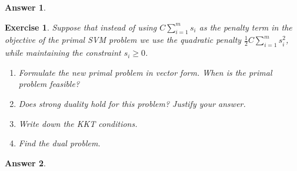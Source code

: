 \documentclass[12pt]{article}
\theoremstyle{colon}
\newtheorem{exercise}{Exercise}
\newtheorem*{answer}{Answer}
\begin{document}
\begin{answer}

\end{answer}

\clearpage

\begin{exercise}
  Suppose that instead of using $C \sum_{i=1}^m s_i$ as the penalty term in the objective of the primal SVM problem we use the quadratic penalty $\frac{1}{2} C \sum_{i=1}^m s_i^2$, while maintaining the constraint $s_i \geq 0$. 

  \begin{enumerate}[label=\alph*)]
    \item Formulate the new primal problem in vector form. When is the primal problem feasible?

    \item Does strong duality hold for this problem? Justify your answer.

    \item Write down the KKT conditions.

    \item Find the dual problem.
  \end{enumerate}
\end{exercise}

\begin{answer}

\end{answer}

\clearpage
\end{document}
